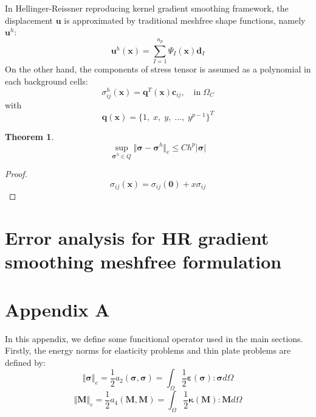 \documentclass{article}
\newtheorem{theorem}{Theorem}
\begin{document}
In Hellinger-Reissner reproducing kernel gradient smoothing framework, the displacement $\boldsymbol u$ is approximated by traditional meshfree shape functions, namely $\boldsymbol u^h$:
\begin{equation}
    \boldsymbol u^h(\boldsymbol x) = \sum_{I=1}^{n_p} \Psi_I(\boldsymbol x) \boldsymbol d_I
\end{equation}
On the other hand, the components of stress tensor is assumed as a polynomial in each background cells:
\begin{equation}
    \sigma^h_{ij}(\boldsymbol x) = \boldsymbol q^T(\boldsymbol x) \boldsymbol c_{ij}, \quad \mathrm{in}\; \Omega_C
\end{equation}
with
\begin{equation}
    \boldsymbol q(\boldsymbol x) = \{1,\;x,\;y,\;\dots,\;y^{p-1}\}^T
\end{equation}
\begin{theorem}
    \begin{equation}
        \sup_{\boldsymbol \sigma^h \in Q}\Vert \boldsymbol \sigma - \boldsymbol \sigma^h \Vert_{e} \le Ch^{p} \vert \boldsymbol \sigma \vert
    \end{equation}
\end{theorem}
\begin{proof}
    \begin{equation}
        \sigma_{ij}(\boldsymbol{x}) = \sigma_{ij}(\boldsymbol{0}) + x \sigma_{ij}
    \end{equation}
\end{proof}

\section{Error analysis for HR gradient smoothing meshfree formulation}
\section*{Appendix A}
In this appendix, we define some funcitional operator used in the main sections. Firstly, the energy norms for elasticity problems and thin plate problems are defined by:
\begin{equation}
    \Vert \boldsymbol{\sigma} \Vert_e = \frac{1}{2} a_{2}(\boldsymbol{\sigma},\boldsymbol{\sigma}) = \int_{\Omega} \frac{1}{2} \boldsymbol{\varepsilon}(\boldsymbol{\sigma}) : \boldsymbol{\sigma} d\Omega
\end{equation} 
\begin{equation}
    \Vert \boldsymbol{M} \Vert_e = \frac{1}{2}a_4(\boldsymbol{M}, \boldsymbol{M}) = \int_{\Omega} \frac{1}{2} \boldsymbol{\kappa}(\boldsymbol{M}) : \boldsymbol{M} d\Omega
\end{equation}

\end{document}
